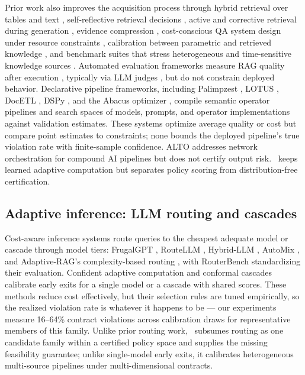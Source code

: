 Prior work also improves the acquisition process
through hybrid retrieval
over tables and text \citep{chen2020hybridqa}, self-reflective
retrieval decisions \citep{asai2024selfrag}, active and corrective
retrieval during generation
\citep{jiang2023flare,yan2024corrective}, evidence compression
\citep{xu2024recomp}, cost-conscious QA system design under resource
constraints \citep{budur2024openqa}, calibration between parametric
and retrieved knowledge \citep{deng2026collaborative}, and benchmark
suites that
stress heterogeneous and time-sensitive knowledge sources
\citep{yang2024cragbench,stelmakh2022asqa,amouyal2022qampari,
gao2023alce,chen2024rgb}. Automated evaluation frameworks measure RAG
quality after execution
\citep{es2024ragas,saadfalcon2024ares,ru2024ragchecker,tang2024minicheck}, typically via
LLM judges \citep{zheng2023judging}, but do not constrain deployed
behavior. Declarative pipeline frameworks, including Palimpzest
\citep{liu2025palimpzest}, LOTUS \citep{patel2024lotus}, DocETL
\citep{shankar2024docetl}, DSPy \citep{khattab2023dspy}, and the
Abacus optimizer \citep{russo2025abacus}, compile semantic operator
pipelines and search spaces of models, prompts, and operator
implementations against validation estimates. These systems optimize
average quality or cost but compare point estimates to constraints;
none bounds the deployed pipeline's true violation rate with
finite-sample confidence. ALTO \citep{santhanam2024alto} addresses
network orchestration for compound AI pipelines but does not certify
output risk. \system\ keeps learned adaptive computation but separates
policy scoring from distribution-free certification.

\subsection{Adaptive inference: LLM routing and cascades}
Cost-aware inference systems route queries to the cheapest adequate
model or cascade through model tiers: FrugalGPT \citep{chen2023frugalgpt},
RouteLLM \citep{ong2024routellm}, Hybrid-LLM \citep{ding2024hybridllm},
AutoMix \citep{aggarwal2024automix}, and Adaptive-RAG's
complexity-based
routing \citep{jeong2024adaptiverag}, with RouterBench
\citep{hu2024routerbench} standardizing their evaluation. Confident
adaptive computation
\citep{schuster2022calm} and conformal cascades \citep{fisch2021admission}
calibrate early exits for a single model or a cascade with shared
scores. These methods reduce cost effectively, but their selection
rules are tuned empirically, so the realized violation rate is whatever
it happens to be --- our experiments measure 16--64\% contract
violations across calibration draws for representative members of this
family. Unlike prior routing work, \system\ subsumes routing as one
candidate family within a certified policy space and supplies the
missing feasibility guarantee; unlike single-model early exits, it
calibrates heterogeneous multi-source pipelines under
multi-dimensional contracts.

